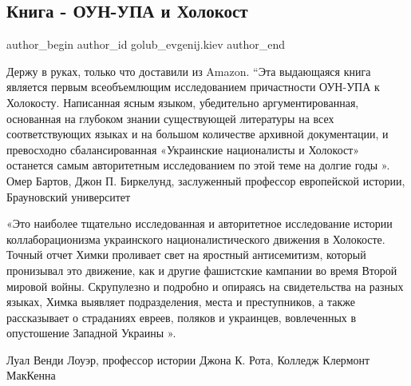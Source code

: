  
 
 
 
 
 
\subsection{Книга - ОУН-УПА и Холокост}
\label{sec:14_11_2021.fb.golub_evgenij.kiev.1.oun_upa_holokost}
 
\ifcmt
 author_begin
   author_id golub_evgenij.kiev
 author_end
\fi


Держу в руках, только что доставили из Amazon. “Эта выдающаяся книга является
первым всеобъемлющим исследованием причастности ОУН-УПА к Холокосту.
Написанная ясным языком, убедительно аргументированная, основанная на глубоком
знании существующей литературы на всех соответствующих языках и на большом
количестве архивной документации, и превосходно сбалансированная  «Украинские
националисты и Холокост» останется  самым авторитетным исследованием по этой
теме на долгие годы ».  Омер Бартов, Джон П. Биркелунд, заслуженный профессор
европейской истории, Брауновский университет 

«Это наиболее тщательно исследованная и авторитетное исследование истории
коллаборационизма украинского националистического движения в Холокосте. Точный
отчет Химки проливает свет на яростный антисемитизм, который пронизывал это
движение, как и другие фашистские кампании во время Второй мировой войны.
Скрупулезно и подробно и опираясь на свидетельства на разных языках, Химка
выявляет подразделения, места и преступников, а также рассказывает о страданиях
евреев, поляков и украинцев, вовлеченных в опустошение Западной Украины ».  

Луал Венди Лоуэр, профессор истории Джона К. Рота, Колледж Клермонт МакКенна

